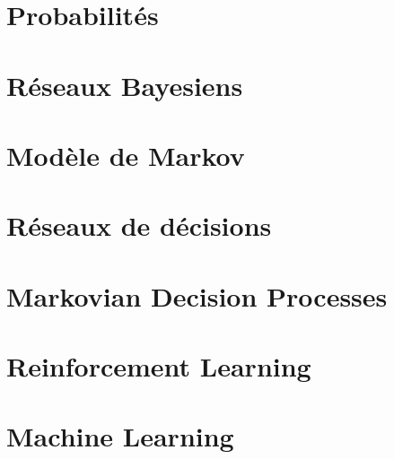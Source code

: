 \documentclass[a4paper, 12pt]{extarticle}
\begin{document}
\section{Probabilités} %
\label{sec:probabilites}

\newpage

\section{Réseaux Bayesiens} %
\label{sec:reseaux_bayesiens}



\section{Modèle de Markov} %
\label{sec:modele_de_markov}

\newpage

\section{Réseaux de décisions} %
\label{sec:reseaux_de_decisions}

\newpage

\section{Markovian Decision Processes} %
\label{sec:markovian_decision_processes}

\newpage

\section{Reinforcement Learning} %
\label{sec:reinforcement_learning}

\newpage

\section{Machine Learning} %
\label{sec:machine_learning}



\end{document}

